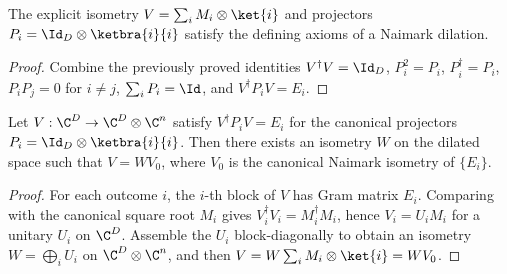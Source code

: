 \begin{theorem}
    \label{thm:is_naimark_dilation_naimark}
    \leanok
    The explicit isometry $V=\sum_iM_i\otimes\ket{i}$ and projectors
    $P_i=\Id_D\otimes\ketbra{i}{i}$ satisfy the defining axioms
    of a Naimark dilation.
\end{theorem}

\begin{proof}
    \leanok
    Combine the previously proved identities $V^\dagger V=\Id_D$,
    $P_i^2=P_i$, $P_i^\dagger=P_i$, $P_iP_j=0$ for $i\ne j$,
    $\sum_iP_i=\Id$, and $V^\dagger P_iV=E_i$.
\end{proof}

\begin{theorem}
    \label{thm:naimark_concrete_uniqueness}
    \leanok
    Let $V:\C^D\to\C^D\otimes\C^n$ satisfy
    $V^\dagger P_iV=E_i$ for the canonical projectors
    $P_i=\Id_D\otimes\ketbra{i}{i}$.
    Then there exists an isometry $W$ on the dilated space such that
    $V=WV_0$, where $V_0$ is the canonical Naimark isometry of $\{E_i\}$.
\end{theorem}

\begin{proof}
    \leanok
    For each outcome $i$, the $i$-th block of $V$ has Gram matrix $E_i$.
    Comparing with the canonical square root $M_i$ gives
    $V_i^\dagger V_i=M_i^\dagger M_i$, hence $V_i=U_iM_i$ for a unitary
    $U_i$ on $\C^D$. Assemble the $U_i$ block-diagonally to obtain an
    isometry $W=\bigoplus_iU_i$ on $\C^D\otimes\C^n$, and then
    $V=W\sum_iM_i\otimes\ket{i}=WV_0$.
\end{proof}

